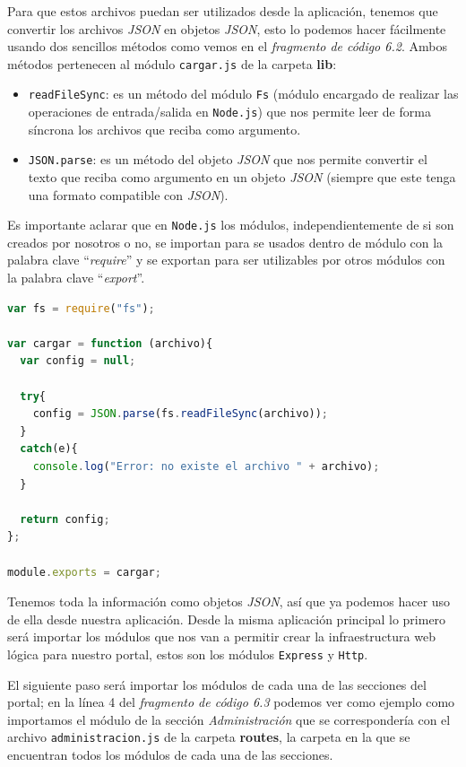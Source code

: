 Para que estos archivos puedan ser utilizados desde la aplicación, tenemos que convertir los archivos \textit{JSON} en objetos \textit{JSON}, esto lo podemos hacer fácilmente usando dos sencillos métodos como vemos en el \textit{fragmento de código 6.2}. Ambos métodos pertenecen al módulo {\tt cargar.js} de la carpeta \textbf{lib}:

\begin{itemize}
	\item {\tt readFileSync}: es un método del módulo {\tt Fs} (módulo encargado de realizar las operaciones de entrada/salida en {\tt Node.js}) que nos permite leer de forma síncrona los archivos que reciba como argumento.
	\item {\tt JSON.parse}: es un método del objeto \textit{JSON} que nos permite convertir el texto que reciba como argumento en un objeto \textit{JSON} (siempre que este tenga una formato compatible con \textit{JSON}).
\end{itemize}

Es importante aclarar que en {\tt Node.js} los módulos, independientemente de si son creados por nosotros o no, se importan para se usados dentro de módulo con la palabra clave ``\textit{require}'' y se exportan para ser utilizables por otros módulos con la palabra clave ``\textit{export}''.

\newpage
\begin{lstlisting}[language=javascript,caption={Archivo cargar.js},label={lst:cargarjs}]
var fs = require("fs");
 
var cargar = function (archivo){
  var config = null;

  try{
    config = JSON.parse(fs.readFileSync(archivo));
  }
  catch(e){
    console.log("Error: no existe el archivo " + archivo);
  }

  return config;
};

module.exports = cargar;
\end{lstlisting}

Tenemos toda la información como objetos \textit{JSON}, así que ya podemos hacer uso de ella desde nuestra aplicación. Desde la misma aplicación principal lo primero será importar los módulos que nos van a permitir crear la infraestructura web lógica para nuestro portal, estos son los módulos {\tt Express} y {\tt Http}.

\bigskip
El siguiente paso será importar los módulos de cada una de las secciones del portal; en la línea 4 del \textit{fragmento de código 6.3} podemos ver como ejemplo como importamos el módulo de la sección \textit{Administración} que se correspondería con el archivo {\tt administracion.js} de la carpeta \textbf{routes}, la carpeta en la que se encuentran todos los módulos de cada una de las secciones.

